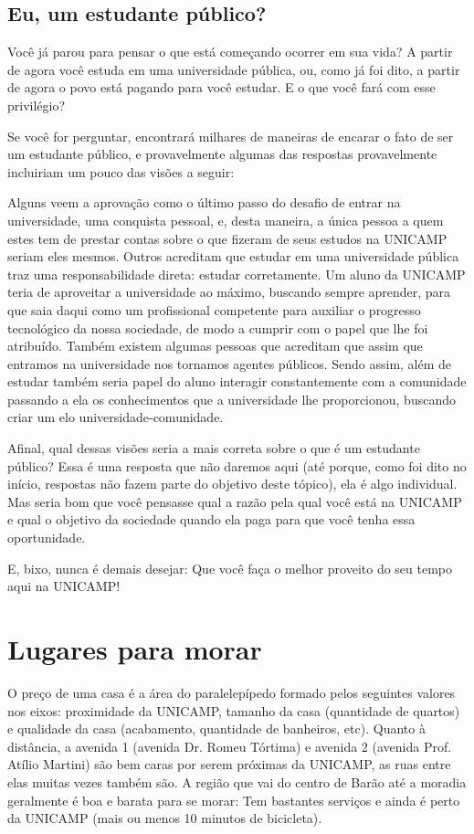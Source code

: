 \subsection{Eu, um estudante público?} Você já parou para pensar o que está
começando ocorrer em sua vida? A partir de agora você estuda em uma universidade
pública, ou, como já foi dito, a partir de agora o povo está pagando para você
estudar. E o que você fará com esse privilégio?

Se você for perguntar, encontrará milhares de maneiras de encarar o fato de ser
um estudante público, e provavelmente algumas das respostas provavelmente
incluiriam um pouco das visões a seguir:

Alguns veem a aprovação como o último passo do desafio de entrar na
universidade, uma conquista pessoal, e, desta maneira, a única pessoa a quem
estes tem de prestar contas sobre o que fizeram de seus estudos na UNICAMP
seriam eles mesmos. Outros acreditam que estudar em uma universidade pública
traz uma responsabilidade direta: estudar corretamente. Um aluno da UNICAMP
teria de aproveitar a universidade ao máximo, buscando sempre aprender, para que
saia daqui como um profissional competente para auxiliar o progresso tecnológico
da nossa sociedade, de modo a cumprir com o papel que lhe foi atribuído. Também
existem algumas pessoas que acreditam que assim que entramos na universidade nos
tornamos agentes públicos. Sendo assim, além de estudar também seria papel do
aluno interagir constantemente com a comunidade passando a ela os conhecimentos
que a universidade lhe proporcionou, buscando criar um elo
universidade-comunidade.

Afinal, qual dessas visões seria a mais correta sobre o que é um estudante
público? Essa é uma resposta que não daremos aqui (até porque, como foi dito no
início, respostas não fazem parte do objetivo deste tópico), ela é algo
individual. Mas seria bom que você pensasse qual a razão pela qual você está na
UNICAMP e qual o objetivo da sociedade quando ela paga para que você tenha essa
oportunidade.

E, bixo, nunca é demais desejar: Que você faça o melhor proveito do seu tempo
aqui na UNICAMP!

\section{Lugares para morar}
O preço de uma casa é a área do paralelepípedo formado pelos seguintes valores
nos eixos: proximidade da UNICAMP, tamanho da casa (quantidade de quartos)
e qualidade da casa (acabamento, quantidade de banheiros, etc). Quanto
à distância, a avenida 1 (avenida Dr. Romeu Tórtima) e avenida 2 (avenida Prof.
Atílio Martini) são bem caras por serem próximas da UNICAMP, as ruas entre elas
muitas vezes também são. A região que vai do centro de Barão até a moradia
geralmente é boa e barata para se morar: Tem bastantes serviços e ainda é perto
da UNICAMP (mais ou menos 10 minutos de bicicleta).

